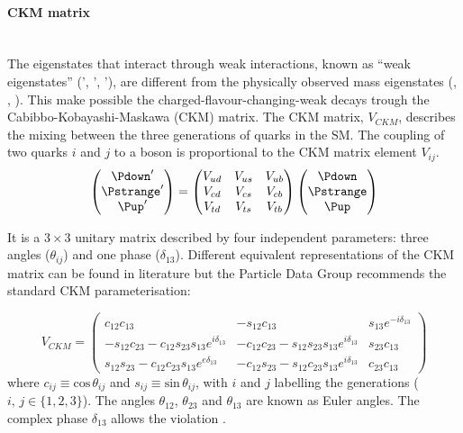 
\paragraph{CKM matrix}\mbox{}\\
The eigenstates that interact through weak interactions, known as ``weak eigenstates'' 
(\Pdown', \Pstrange', \Pup'), are different from the physically observed mass eigenstates 
(\Pdown, \Pstrange , \Pup). This make possible the charged-flavour-changing-weak decays
trough the Cabibbo-Kobayashi-Maskawa (CKM) matrix.
The CKM matrix, $V_{CKM}$, describes the mixing between the three generations of quarks in the SM. 
The coupling of two quarks $i$ and $j$ to a \PW boson is proportional to the CKM matrix element $V_{ij}$.
\begin{equation}
	\begin{pmatrix} \Pdown' \\ \Pstrange ' \\ \Pup ' \end{pmatrix}  = \begin{pmatrix} 	V_{ud} & V_{us} & V_{ub} \\
																V_{cd} & V_{cs} & V_{cb} \\ 
																V_{td}  & V_{ts}  & V_{tb} \end{pmatrix}
												 \begin{pmatrix} \Pdown \\ \Pstrange  \\ \Pup  \end{pmatrix}
\end{equation}

It is a $3 \times 3$ unitary matrix described by four independent parameters: three angles ($\theta_{ij}$) and one phase ($\delta_{13}$). 
Different equivalent representations of the CKM matrix can be found in literature but the Particle Data Group recommends the standard CKM
parameterisation:

\begin{equation}
V_{CKM} = 	\begin{pmatrix}	
						c_{12}c_{13}				&                  -s_{12} c_{13}					& s_{13}e^{-i \delta_{13}} 	\\
			-s_{12}c_{23}-c_{12}s_{23}s_{13}e^{i\delta_{13}}	& -c_{12}c_{23}-s_{12}s_{23}s_{13}e^{i\delta_{13}}	& s_{23}c_{13} 			\\
			s_{12}s_{23}-c_{12}c_{23}s_{13}e^{e\delta_{13}}	& -c_{12}s_{23}-s_{12}c_{23}s_{13}e^{i\delta_{13}}	& c_{23}c_{13}
			\end{pmatrix}		
\end{equation}
where $c_{ij} \equiv \textrm{cos}\,\theta_{ij}$ and  $s_{ij} \equiv \textrm{sin}\,\theta_{ij}$, 
with $i$ and $j$ labelling the generations ($i,\,j \in \{1,2,3\}$).
The angles $\theta_{12}$,  $\theta_{23}$ and  $\theta_{13}$ are known as Euler angles.  
The complex phase $\delta_{13}$ allows the \CP violation \cite{Chau:1984fp}.

